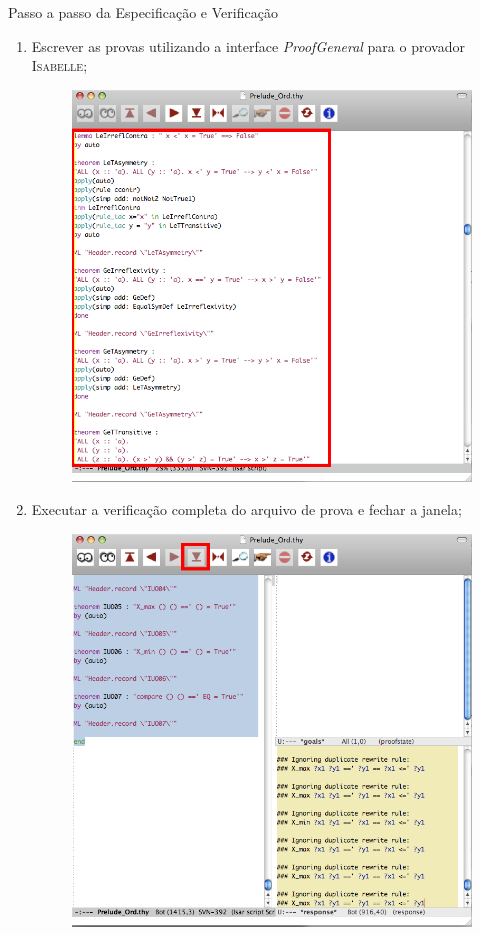 \documentclass{beamer}
\newcommand{\Isabelle}{\textsc{Isabelle}\xspace}
\begin{document}
\begin{frame}[allowframebreaks]{Passo a passo da Especificação e Verificação}
\begin{enumerate}
		\item Escrever as provas utilizando a interface \textit{ProofGeneral} para o provador \Isabelle;
		\begin{figure}
			\includegraphics[height=0.7\textheight]{figuras/passo_a_passo/Picture06.png}
		\end{figure}

		\framebreak
		\item Executar a verificação completa do arquivo de prova e fechar a janela;
		\begin{figure}		
			\includegraphics[height=0.7\textheight]{figuras/passo_a_passo/Picture07.png}
		\end{figure}
		

\end{enumerate}
\end{frame}
\end{document}
